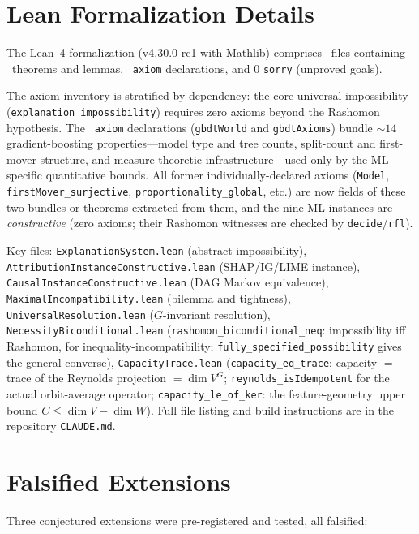 \documentclass[11pt]{article}
\begin{document}
\section{Lean Formalization Details}

The Lean~4 formalization (v4.30.0-rc1 with Mathlib) comprises \ClaimMainFiles~files containing \ClaimMainTheorems~theorems and lemmas, \ClaimMainAxioms~\texttt{axiom} declarations, and 0 \texttt{sorry} (unproved goals).

The axiom inventory is stratified by dependency: the core universal impossibility (\texttt{explanation\_impossibility}) requires zero axioms beyond the Rashomon hypothesis.  The \ClaimMainAxioms~\texttt{axiom} declarations (\texttt{gbdtWorld} and \texttt{gbdtAxioms}) bundle ${\sim}14$ gradient-boosting properties---model type and tree counts, split-count and first-mover structure, and measure-theoretic infrastructure---used only by the ML-specific quantitative bounds.  All former individually-declared axioms (\texttt{Model}, \texttt{firstMover\_surjective}, \texttt{proportionality\_global}, etc.) are now fields of these two bundles or theorems extracted from them, and the nine ML instances are \emph{constructive} (zero axioms; their Rashomon witnesses are checked by \texttt{decide}/\texttt{rfl}).

Key files: \texttt{ExplanationSystem.lean} (abstract impossibility), \texttt{AttributionInstanceConstructive.lean} (SHAP/IG/LIME instance), \texttt{CausalInstanceConstructive.lean} (DAG Markov equivalence), \texttt{MaximalIncompatibility.lean} (bilemma and tightness), \texttt{UniversalResolution.lean} ($G$-invariant resolution), \texttt{NecessityBiconditional.lean} (\texttt{rashomon\_biconditional\_neq}: impossibility iff Rashomon, for inequality-incompatibility; \texttt{fully\_specified\_possibility} gives the general converse), \texttt{CapacityTrace.lean} (\texttt{capacity\_eq\_trace}: capacity $=$ trace of the Reynolds projection $= \dim V^G$; \texttt{reynolds\_isIdempotent} for the actual orbit-average operator; \texttt{capacity\_le\_of\_ker}: the feature-geometry upper bound $C \leq \dim V - \dim W$).  Full file listing and build instructions are in the repository \texttt{CLAUDE.md}.

\section{Falsified Extensions}

Three conjectured extensions were pre-registered and tested, all falsified:
\end{document}
